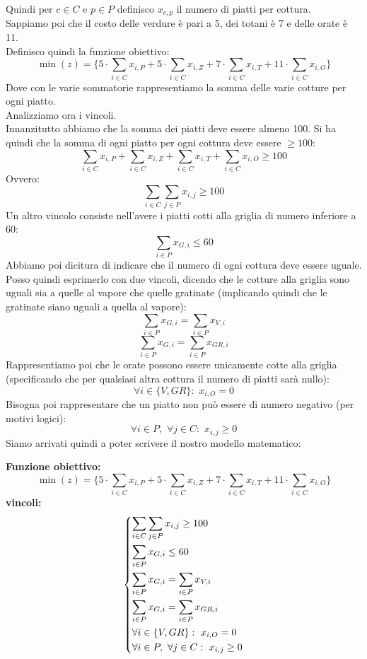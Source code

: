 \documentclass[a4paper,12pt, oneside]{book}
\begin{document}
Quindi per $c\in C$ e $p\in P$ definisco $x_{c,p}$ il numero di piatti
per cottura.\\
Sappiamo poi che il costo delle verdure è pari a 5, dei totani è 7 e
delle orate è 11.\\ 
Definisco quindi la funzione obiettivo:
\[\min(z)=\bigg\{5\cdot\sum_{i\in C}x_{i,P}+5\cdot\sum_{i\in
    C}x_{i,Z}+7\cdot\sum_{i\in C}x_{i,T}+11\cdot\sum_{i\in
    C}x_{i,O}\Bigg\}\]
Dove con le varie sommatorie rappresentiamo la somma delle varie
cotture per ogni piatto.\\
Analizziamo ora i vincoli.\\
Innanzitutto abbiamo che la somma dei piatti deve essere almeno
100. Si ha quindi che la somma di ogni piatto per ogni cottura deve
essere $\geq 100$:
\[\sum_{i\in C}x_{i,P}+\sum_{i\in
    C}x_{i,Z}+\sum_{i\in C}x_{i,T}+\sum_{i\in
    C}x_{i,O}\geq 100\]
Ovvero:
\[\sum_{i\in C}\sum_{j\in P}x_{i,j} \geq 100\]
Un altro vincolo consiste nell'avere i piatti cotti alla griglia di
numero inferiore a 60:
\[\sum_{i\in P}x_{G,i}\leq 60\]
Abbiamo poi dicitura di indicare che il numero di ogni cottura deve
essere uguale. Posso quindi esprimerlo con due vincoli, dicendo che le
cotture alla griglia sono uguali sia a quelle al vapore che quelle
gratinate (implicando quindi che le gratinate siano uguali a quella al
vapore):
\[\sum_{i\in P}x_{G,i}=\sum_{i\in P}x_{V,i}\]
\[\sum_{i\in P}x_{G,i}=\sum_{i\in P}x_{GR,i}\]
Rappresentiamo poi che le orate possono essere unicamente cotte alla
griglia (specificando che per qualsiasi altra cottura il numero di
piatti sarà nullo):
\[\forall i\in \{V,GR\}:\,\,x_{i,O}=0\]
Bisogna poi rappresentare che un piatto non può essere di numero
negativo (per motivi logici):
\[\forall i\in P,\,\,\forall j\in C:\,\, x_{i,j}\geq 0\]
\newpage
Siamo arrivati quindi a poter scrivere il nostro modello matematico:
\begin{shaded}
  \textbf{Funzione obiettivo:}
  \[\min(z)=\Bigg\{5\cdot\sum_{i\in C}x_{i,P}+5\cdot\sum_{i\in
      C}x_{i,Z}+7\cdot\sum_{i\in C}x_{i,T}+11\cdot\sum_{i\in
      C}x_{i,O}\Bigg\}\]
  \textbf{vincoli:}
  \[
    \begin{dcases}
      \sum_{i\in C}\sum_{j\in P}x_{i,j} \geq 100\\
      \sum_{i\in P}x_{G,i}\leq 60\\
      \sum_{i\in P}x_{G,i}=\sum_{i\in P}x_{V,i}\\
      \sum_{i\in P}x_{G,i}=\sum_{i\in P}x_{GR,i}\\
      \forall i\in \{V, GR\}:\,\,x_{i,O}=0\\
      \forall i\in P,\,\,\forall j\in C:\,\, x_{i,j}\geq 0
    \end{dcases}
  \]
\end{shaded}
\end{document}
